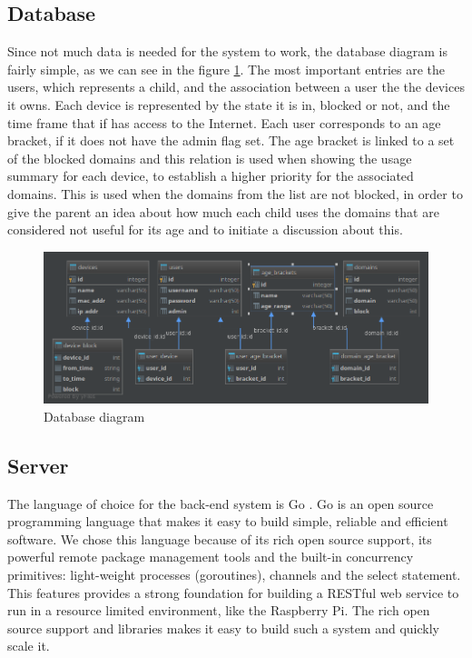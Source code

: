 \subsection{Database}
Since not much data is needed for the system to work, the database diagram is fairly simple, as we can see in the figure \ref{fig:database-diagram}. The most important entries are the users, which represents a child, and the association between a user the the devices it owns. Each device is represented by the state it is in, blocked or not, and the time frame that if has access to the Internet. Each user corresponds to an age bracket, if it does not have the admin flag set. The age bracket is linked to a set of the blocked domains and this relation is used when showing the usage summary for each device, to establish a higher priority for the associated domains. This is used when the domains from the list are not blocked, in order to give the parent an idea about how much each child uses the domains that are considered not useful for its age and to initiate a discussion about this.

\begin{figure}[th]
\centering
\includegraphics[width=1\textwidth]{Figures/database-diagram}
\decoRule
\caption{Database diagram}
\label{fig:database-diagram}
\end{figure}

\subsection{Server}

The language of choice for the back-end system is Go \citep{golang}. Go is an open source programming language that makes it easy to build simple, reliable and efficient software. We chose this language because of its rich open source support, its powerful remote package management tools and the built-in concurrency primitives: light-weight processes (goroutines), channels and the select statement. This features provides a strong foundation for building a RESTful web service to run in a resource limited environment, like the Raspberry Pi. The rich open source support and libraries makes it easy to build such a system and quickly scale it.

